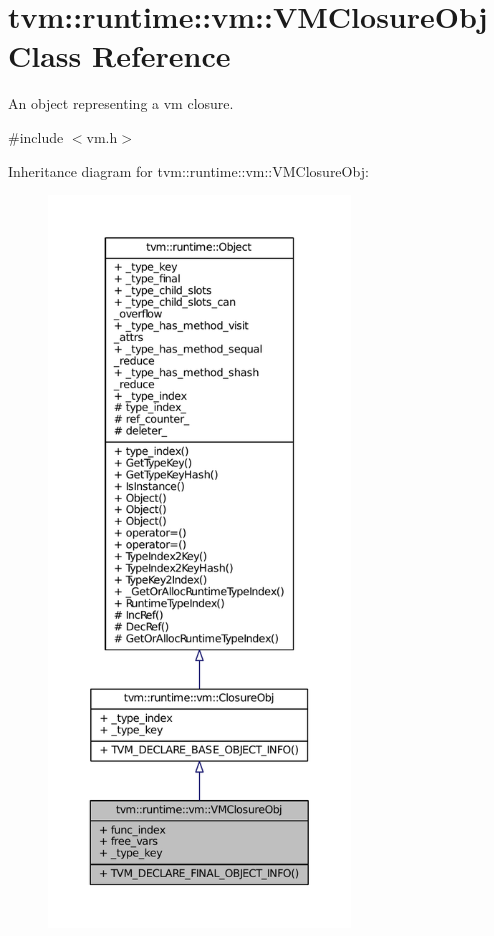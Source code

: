 \hypertarget{classtvm_1_1runtime_1_1vm_1_1VMClosureObj}{}\section{tvm\+:\+:runtime\+:\+:vm\+:\+:V\+M\+Closure\+Obj Class Reference}
\label{classtvm_1_1runtime_1_1vm_1_1VMClosureObj}


An object representing a vm closure.  




{\ttfamily \#include $<$vm.\+h$>$}



Inheritance diagram for tvm\+:\+:runtime\+:\+:vm\+:\+:V\+M\+Closure\+Obj\+:
\nopagebreak
\begin{figure}[H]
\begin{center}
\leavevmode
\includegraphics[height=550pt]{classtvm_1_1runtime_1_1vm_1_1VMClosureObj__inherit__graph}
\end{center}
\end{figure}


